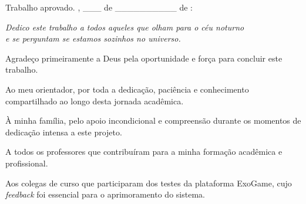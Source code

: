 \documentclass[
	12pt,
	openany,
	oneside,
	a4paper,
	english,
	brazil
]{abntex2}
\begin{document}
\begin{folhadeaprovacao}
  \begin{center}
    {\ABNTEXchapterfont\large\imprimirautor}
    \vspace*{\fill}\vspace*{\fill}
    \begin{center}
      \ABNTEXchapterfont\bfseries\Large\imprimirtitulo
    \end{center}
    \vspace*{\fill}
    \hspace{.45\textwidth}
    \begin{minipage}{.5\textwidth}
        \imprimirpreambulo
    \end{minipage}%
    \vspace*{\fill}
  \end{center}

  Trabalho aprovado. \imprimirlocal, \_\_\_ de \_\_\_\_\_\_\_\_\_\_ de \imprimirdata:


  \begin{center}
    \vspace*{0.5cm}
    {\large\imprimirlocal}
    \par
    {\large\imprimirdata}
    \vspace*{1cm}
  \end{center}
\end{folhadeaprovacao}

\begin{dedicatoria}
   \vspace*{\fill}
   \centering
   \noindent
   \textit{Dedico este trabalho a todos aqueles que olham para o céu noturno\\
   e se perguntam se estamos sozinhos no universo.} \vspace*{\fill}
\end{dedicatoria}

\begin{agradecimentos}
Agradeço primeiramente a Deus pela oportunidade e força para concluir este trabalho.

Ao meu orientador, por toda a dedicação, paciência e conhecimento compartilhado ao longo desta jornada acadêmica.

À minha família, pelo apoio incondicional e compreensão durante os momentos de dedicação intensa a este projeto.

A todos os professores que contribuíram para a minha formação acadêmica e profissional.

Aos colegas de curso que participaram dos testes da plataforma ExoGame, cujo \textit{feedback} foi essencial para o aprimoramento do sistema.
\end{agradecimentos}
\end{document}
